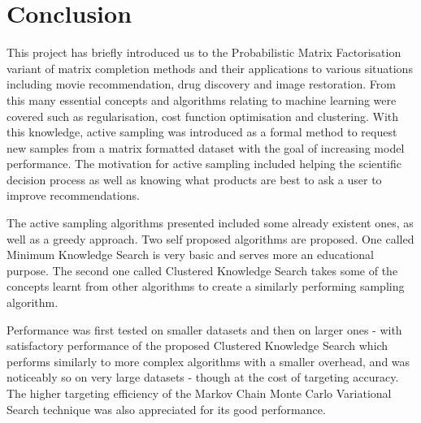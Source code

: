 \def\baselinestretch{1}
\chapter{Conclusion}
\ifpdf
    \graphicspath{{Conclusions/ConclusionsFigs/PNG/}{Conclusions/ConclusionsFigs/PDF/}{Conclusions/ConclusionsFigs/}}
\else
    \graphicspath{{Conclusions/ConclusionsFigs/EPS/}{Conclusions/ConclusionsFigs/}}
\fi


This project has briefly introduced us to the Probabilistic Matrix Factorisation variant of matrix completion methods and their applications to various situations including movie recommendation, drug discovery and image restoration. From this many essential concepts and algorithms relating to machine learning were covered such as regularisation, cost function optimisation and clustering. With this knowledge, active sampling was introduced as a formal method to request new samples from a matrix formatted dataset with the goal of increasing model performance. The motivation for active sampling included helping the scientific decision process as well as knowing what products are best to ask a user to improve recommendations.

The active sampling algorithms presented included some already existent ones, as well as a greedy approach. Two self proposed algorithms are proposed. One called Minimum Knowledge Search is very basic and serves more an educational purpose. The second one called Clustered Knowledge Search takes some of the concepts learnt from other algorithms to create a similarly performing sampling algorithm.

Performance was first tested on smaller datasets and then on larger ones - with satisfactory performance of the proposed Clustered Knowledge Search which performs similarly to more complex algorithms with a smaller overhead, and was noticeably so on very large datasets - though at the cost of targeting accuracy. The higher targeting efficiency of the Markov Chain Monte Carlo Variational Search technique was also appreciated for its good performance.



